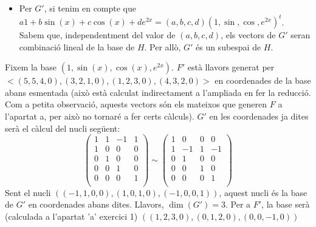 \documentclass[a4paper, 12pt]{article}
\begin{document}
\begin{solucio}
\begin{itemize}
\begin{displaymath}
                \right)
            \end{displaymath}
            Com podem veure, els vectors generadors de $F'$ desapareixen en reduir la matriu,
            per això $F'$ és un subespai de $H$.
            \item Per $G'$, si tenim en compte que $a1 + b\sin(x) + c\cos(x) + de^{2x} = (a, b, c, d)(1,\sin,\cos,e^{2x})^t$.
            Sabem que, independentment del valor de $(a, b, c, d)$, els vectors de $G'$ seran
            combinació lineal de la base de $H$. Per allò, $G'$ és un subespai de $H$.
        \end{itemize}
        Fixem la base $(1, \sin(x), \cos(x), e^{2x})$. $F'$ està llavors generat per $<(5, 5, 4, 0), (3, 2, 1, 0), (1, 2, 3, 0), (4, 3, 2, 0)>$
        en coordenades de la base abans esmentada (això està calculat indirectament a l'ampliada en
        fer la reducció. Com a petita observació, aquests vectors són els mateixos que generen $F$
        a l'apartat a, per això no tornaré a fer certs càlculs). $G'$ en les coordenades ja dites serà el càlcul del nucli següent:
        \begin{displaymath}
            \left(
                \begin{array}{cccc}
                    1 & 1 & -1 & 1\\
                    \hline
                    1 & 0 & 0 & 0\\
                    0 & 1 & 0 & 0\\
                    0 & 0 & 1 & 0\\
                    0 & 0 & 0 & 1\\
                \end{array}
            \right)
            \sim
            \left(
                \begin{array}{cccc}
                    1 & 0 & 0 & 0\\
                    \hline
                    1 & -1 & 1 & -1\\
                    0 & 1 & 0 & 0\\
                    0 & 0 & 1 & 0\\
                    0 & 0 & 0 & 1\\
                \end{array}
            \right)
        \end{displaymath}
        Sent el nucli $((-1, 1, 0, 0), (1, 0, 1, 0), (-1, 0, 0, 1))$, aquest nucli és la base de $G'$
        en coordenades abans dites.
        Llavors, $\dim(G') = 3$. Per a $F'$, la base serà (calculada a l'apartat 'a' exercici 1) $((1, 2, 3, 0), (0, 1, 2, 0), (0, 0, -1, 0))$

\end{solucio}
\end{document}
